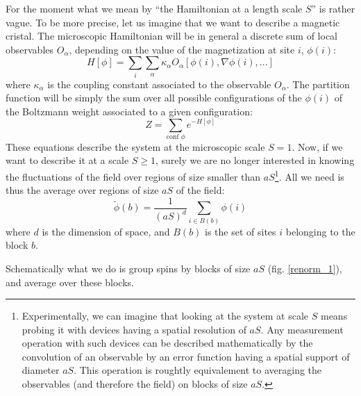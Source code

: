 For the moment what we mean by ``the Hamiltonian at a length scale $S$'' is rather vague. To be more precise, let us imagine that we want to describe a magnetic cristal. The microscopic Hamiltonian will be in general a discrete sum of local observables $O_\alpha$, depending on the value of the magnetization at site $i$, $\phi(i)$:
\begin{equation}
H[\phi] = \sum_i \sum_\alpha \kappa_\alpha O_\alpha[\phi(i), \nabla \phi(i), ...]
\end{equation}
where $\kappa_\alpha$ is the coupling constant associated to the observable $O_\alpha$. The partition function will be simply the sum over all possible configurations of the $\phi(i)$ of the Boltzmann weight associated to a given configuration:
\begin{equation}
Z = \sum_{\text{conf } \phi} e^{-H[\phi]}
\end{equation}
These equations describe the system at the microscopic scale $S=1$. Now, if we want to describe it at a scale $S \geq 1$, surely we are no longer interested in knowing the fluctuations of the field over regions of size smaller than $a S$\footnote{Experimentally, we can imagine that looking at the system at scale $S$ means probing it with devices having a spatial resolution of $a S$. Any measurement operation with such devices can be described mathematically by the convolution of an observable by an error function having a spatial support of diameter $a S$. This operation is roughtly equivalement to averaging the observables (and therefore the field) on blocks of size $a S$.}. All we need is thus the average over regions of size $a S$ of the field:
\begin{equation}
\tilde{\phi}(b) = \frac{1}{(aS)^d} \sum_{i \in B(b)} \phi(i)
\end{equation}
where $d$ is the dimension of space, and $B(b)$ is the set of sites $i$ belonging to the block $b$.

Schematically what we do is group spins by blocks of size $a S$ (fig. \ref{renorm_1}), and average over these blocks.

